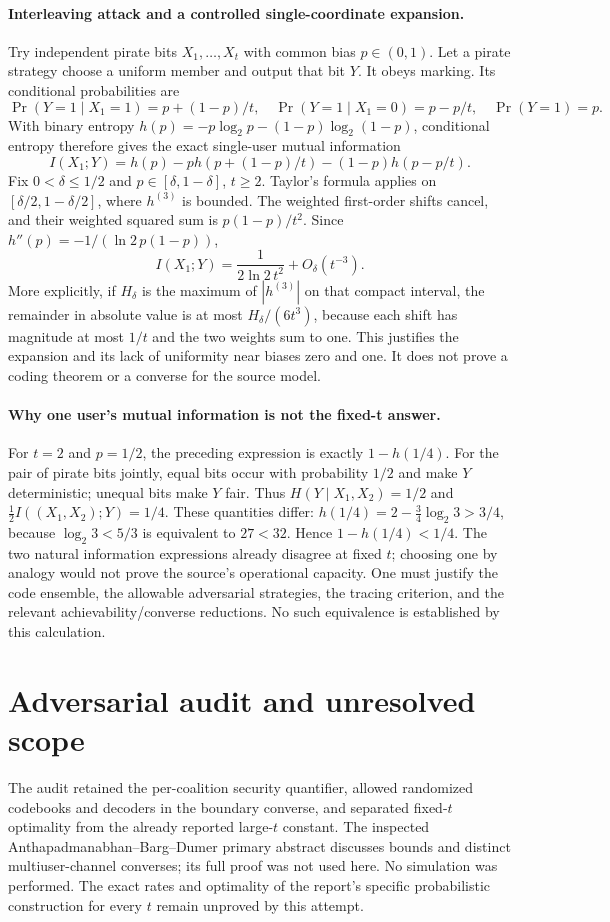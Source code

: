 \documentclass[11pt]{article}
\begin{document}
\paragraph{Interleaving attack and a controlled single-coordinate expansion.}
Try independent pirate bits $X_1,\ldots,X_t$ with common bias $p\in(0,1)$.
Let a pirate strategy choose a uniform member and output that bit $Y$.
It obeys marking. Its conditional probabilities are
\[
\Pr(Y=1\mid X_1=1)=p+(1-p)/t,
\quad \Pr(Y=1\mid X_1=0)=p-p/t,
\quad \Pr(Y=1)=p.
\]
With binary entropy $h(p)=-p\log_2p-(1-p)\log_2(1-p)$, conditional
entropy therefore gives the exact single-user mutual information
\[
I(X_1;Y)=h(p)-p h(p+(1-p)/t)-(1-p)h(p-p/t).
\]
Fix $0<\delta\le1/2$ and $p\in[\delta,1-\delta]$, $t\ge2$.
Taylor's formula applies on $[\delta/2,1-\delta/2]$, where $h^{(3)}$ is
bounded. The weighted first-order shifts cancel, and their weighted squared
sum is $p(1-p)/t^2$. Since $h''(p)=-1/(\ln2\,p(1-p))$,
\[
I(X_1;Y)=\frac1{2\ln2\,t^2}+O_\delta(t^{-3}).
\]
More explicitly, if $H_\delta$ is the maximum of $|h^{(3)}|$ on that compact
interval, the remainder in absolute value is at most $H_\delta/(6t^3)$,
because each shift has magnitude at most $1/t$ and the two weights sum to
one. This justifies the expansion and its lack of uniformity near biases zero
and one. It does not prove a coding theorem or a converse for the source model.

\paragraph{Why one user's mutual information is not the fixed-t answer.}
For $t=2$ and $p=1/2$, the preceding expression is exactly
$1-h(1/4)$. For the pair of pirate bits jointly, equal bits occur with
probability $1/2$ and make $Y$ deterministic; unequal bits make $Y$ fair.
Thus $H(Y\mid X_1,X_2)=1/2$ and
$\tfrac12 I((X_1,X_2);Y)=1/4$.
These quantities differ: $h(1/4)=2-\tfrac34\log_2 3>3/4$, because
$\log_2 3<5/3$ is equivalent to $27<32$. Hence
$1-h(1/4)<1/4$.
The two natural information expressions already disagree at fixed $t$;
choosing one by analogy would not prove the source's operational capacity.
One must justify the code ensemble, the allowable adversarial strategies,
the tracing criterion, and the relevant achievability/converse reductions.
No such equivalence is established by this calculation.

\section{Adversarial audit and unresolved scope}
The audit retained the per-coalition security quantifier, allowed randomized
codebooks and decoders in the boundary converse, and separated fixed-$t$
optimality from the already reported large-$t$ constant. The inspected
Anthapadmanabhan--Barg--Dumer primary abstract discusses bounds and distinct
multiuser-channel converses; its full proof was not used here. No simulation
was performed. The exact rates and optimality of the report's specific
probabilistic construction for every $t$ remain unproved by this attempt.
\end{document}
